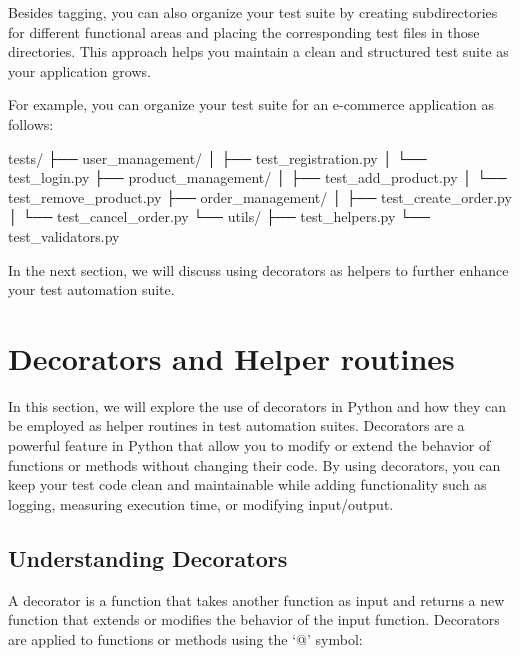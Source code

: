 \documentclass[
  paper=a4,
  ,captions=tableheading
]{scrartcl}
\newenvironment{Shaded}{}{}
\newcommand{\NormalTok}[1]{#1}
\begin{document}
Besides tagging, you can also organize your test suite by creating
subdirectories for different functional areas and placing the
corresponding test files in those directories. This approach helps you
maintain a clean and structured test suite as your application grows.

For example, you can organize your test suite for an e-commerce
application as follows:

\begin{Shaded}
\begin{Highlighting}[]

\NormalTok{tests/}
\NormalTok{  ├── user\_management/}
\NormalTok{  │   ├── test\_registration.py}
\NormalTok{  │   └── test\_login.py}
\NormalTok{  ├── product\_management/}
\NormalTok{  │   ├── test\_add\_product.py}
\NormalTok{  │   └── test\_remove\_product.py}
\NormalTok{  ├── order\_management/}
\NormalTok{  │   ├── test\_create\_order.py}
\NormalTok{  │   └── test\_cancel\_order.py}
\NormalTok{  └── utils/}
\NormalTok{      ├── test\_helpers.py}
\NormalTok{      └── test\_validators.py}
\end{Highlighting}
\end{Shaded}

In the next section, we will discuss using decorators as helpers to
further enhance your test automation suite.

\hypertarget{decorators-and-helper-routines}{%
\section{Decorators and Helper
routines}\label{decorators-and-helper-routines}}

In this section, we will explore the use of decorators in Python and how
they can be employed as helper routines in test automation suites.
Decorators are a powerful feature in Python that allow you to modify or
extend the behavior of functions or methods without changing their code.
By using decorators, you can keep your test code clean and maintainable
while adding functionality such as logging, measuring execution time, or
modifying input/output.

\hypertarget{understanding-decorators}{%
\subsection{Understanding Decorators}\label{understanding-decorators}}

A decorator is a function that takes another function as input and
returns a new function that extends or modifies the behavior of the
input function. Decorators are applied to functions or methods using the
`@' symbol:
\end{document}
